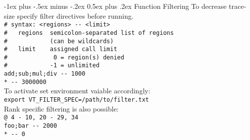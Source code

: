 \documentclass[letterpaper,10pt,landscape]{article}
\makeatletter
\renewcommand{\section}{\@startsection{section}{1}{0mm}%
                                {-1ex plus -.5ex minus -.2ex}%
                                {0.5ex plus .2ex}%
                                {\normalfont\large\bfseries}}
\makeatother
\begin{document}
\begin{multicols}{3}
\section{Function Filtering}
To decrease trace-size specify filter directives before running.\\
\verb!# syntax: <regions> -- <limit>!\\
\verb!#   regions  semicolon-separated list of regions!\\
\verb!#            (can be wildcards)!\\
\verb!#   limit    assigned call limit!\\
\verb!#             0 = region(s) denied!\\
\verb!#            -1 = unlimited!\\
\verb!add;sub;mul;div -- 1000!\\
\verb!* -- 3000000!\\
To activate set environment vaiable accordingly:\\
\texttt{export VT\_FILTER\_SPEC=/path/to/filter.txt}\\
Rank specific filtering is also possible:\\
\verb!@ 4 - 10, 20 - 29, 34!\\
\verb!foo;bar -- 2000!\\
\verb!* -- 0!\\


\end{multicols}
\end{document}

